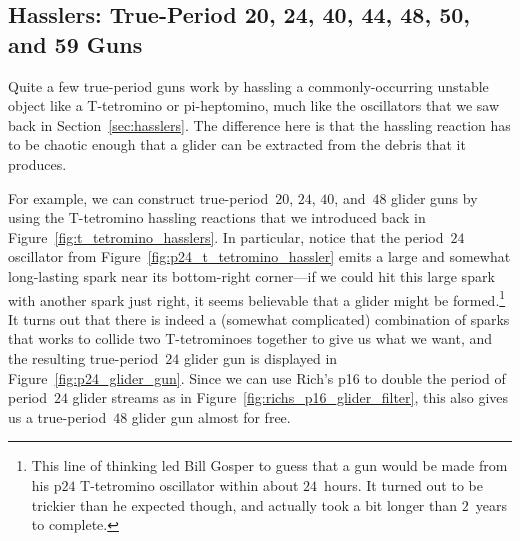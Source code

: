 \subsection{Hasslers: True-Period 20, 24, 40, 44, 48, 50, and 59 Guns}\label{sec:true_period_hassler}

Quite a few true-period guns work by hassling a commonly-occurring unstable object like a T-tetromino or pi-heptomino, much like the oscillators that we saw back in Section~\ref{sec:hasslers}. The difference here is that the hassling reaction has to be chaotic enough that a glider can be extracted from the debris that it produces.

For example, we can construct true-period~$20$, $24$, $40$, and~$48$ glider guns by using the T-tetromino hassling reactions that we introduced back in Figure~\ref{fig:t_tetromino_hasslers}. In particular, notice that the period~$24$ oscillator from Figure~\ref{fig:p24_t_tetromino_hassler} emits a large and somewhat long-lasting spark near its bottom-right corner---if we could hit this large spark with another spark just right, it seems believable that a glider might be formed.\footnote{This line of thinking led Bill Gosper to guess that a gun would be made from his p$24$ T-tetromino oscillator within about $24$~hours. It turned out to be trickier than he expected though, and actually took a bit longer than $2$~years to complete.} It turns out that there is indeed a (somewhat complicated) combination of sparks that works to collide two T-tetrominoes together to give us what we want, and the resulting true-period~$24$ glider gun is displayed in Figure~\ref{fig:p24_glider_gun}. Since we can use Rich's p16 to double the period of period~$24$ glider streams as in Figure~\ref{fig:richs_p16_glider_filter}, this also gives us a true-period~$48$ glider gun almost for free.

